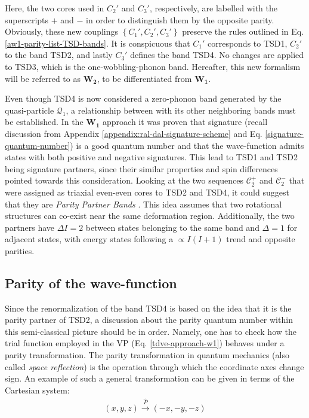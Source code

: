 Here, the two cores used in $C_2'$ and $C_3'$, respectively, are labelled with the superscripts $+$ and $-$ in order to distinguish them by the opposite parity. Obviously, these new couplings $\left\{C_1',C_2',C_3'\right\}$ preserve the rules outlined in Eq. \ref{aw1-parity-list-TSD-bands}. It is conspicuous that $C_1'$ corresponds to TSD1, $C_2'$ to the band TSD2, and lastly $C_3'$ defines the band TSD4. No changes are applied to TSD3, which is the one-wobbling-phonon band. Hereafter, this new formalism will be referred to as $\mathbf{W_2}$, to be differentiated from $\mathbf{W_1}$.

Even though TSD4 is now considered a zero-phonon band generated by the quasi-particle $\mathcal{Q}_1$, a relationship between with its other neighboring bands must be established. In the $\mathbf{W_1}$ approach it was proven \cite{raduta2020approach} that signature (recall discussion from Appendix \ref{appendix:ral-dal-signature-scheme} and Eq. \ref{signature-quantum-number}) is a good quantum number and that the wave-function admits states with both positive and negative signatures. This lead to TSD1 and TSD2 being signature partners, since their similar properties and spin differences pointed towards this consideration. Looking at the two sequences $\mathscr{C}_2^+$ and $\mathscr{C}_2^-$ that were assigned as triaxial even-even cores to TSD2 and TSD4, it could suggest that they are \emph{Parity Partner Bands} \cite{poenaru2021parity}. This idea assumes that two rotational structures can co-exist near the same deformation region. Additionally, the two partners have $\Delta I=2$ between states belonging to the same band and $\Delta = 1$ for adjacent states, with energy states following a $\propto I(I+1)$ trend and opposite parities.

\subsection{Parity of the wave-function}

Since the renormalization of the band TSD4 is based on the idea that it is the parity partner of TSD2, a discussion about the parity quantum number within this semi-classical picture should be in order. Namely, one has to check how the trial function employed in the VP (Eq. \ref{tdve-approach-w1}) behaves under a parity transformation. The parity transformation in quantum mechanics (also called \emph{space reflection}) is the operation through which the coordinate axes change sign. An example of such a general transformation can be given in terms of the Cartesian system:
\begin{align}
    (x,y,z)\stackrel{\hat{P}}{\longrightarrow}(-x,-y,-z)
\end{align}

